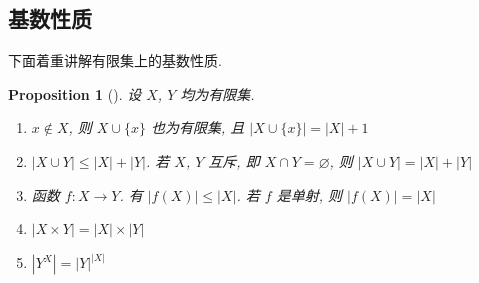 \documentclass[UTF8]{ctexart}
\theoremstyle{mystyle}
\newtheorem{proposition}{Proposition}[section]
\theoremstyle{myremark}
\theoremstyle{plain}
\newcommand{\set}[1]{\{#1\}}
\begin{document}
\subsection{基数性质}
下面着重讲解有限集上的基数性质.

\begin{proposition}[] \label{cardinal II}
    设 $ X $, $ Y $ 均为有限集.
    \begin{enumerate}
        \item $ x \notin X $, 则 $ X \cup \set{x} $ 也为有限集, 且 $ |X \cup \set{x}| = |X| + 1 $
        \item $ |X \cup Y| \leqslant |X| + |Y| $. 若 $ X $, $ Y $ 互斥, 即 $ X \cap Y = \varnothing $, 则 $ |X \cup Y| = |X| + |Y| $
        \item 函数 $ f \colon X \to Y $. 有 $ |f(X)| \leqslant |X| $. 若 $ f $ 是单射, 则 $ |f(X)| = |X| $
        \item $ |X \times Y| = |X| \times |Y| $
        \item $ |Y^X| = |Y|^{|X|} $
    \end{enumerate}
\end{proposition}
\end{document}
